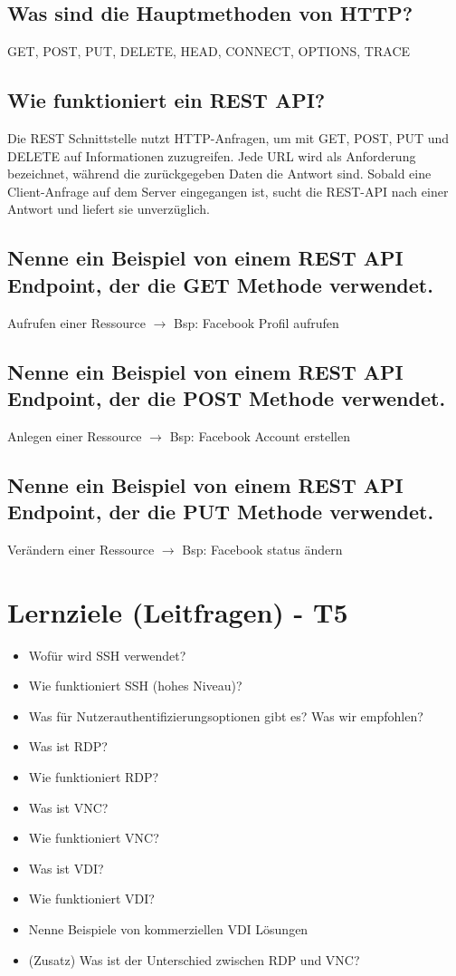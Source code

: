\subsection*{Was sind die Hauptmethoden von HTTP?}
GET, POST, PUT, DELETE, HEAD, CONNECT, OPTIONS, TRACE

\subsection*{Wie funktioniert ein REST API?}
Die REST Schnittstelle nutzt HTTP-Anfragen, um mit GET, POST, PUT und DELETE auf Informationen zuzugreifen. Jede URL wird als Anforderung bezeichnet, während die zurückgegeben Daten die Antwort sind. Sobald eine Client-Anfrage auf dem Server eingegangen ist, sucht die REST-API nach einer Antwort und liefert sie unverzüglich.

\subsection*{Nenne ein Beispiel von einem REST API Endpoint, der die GET Methode verwendet.}
Aufrufen einer Ressource $\rightarrow$ Bsp: Facebook Profil aufrufen

\subsection*{Nenne ein Beispiel von einem REST API Endpoint, der die POST Methode verwendet.}
Anlegen einer Ressource $\rightarrow$ Bsp: Facebook Account erstellen

\subsection*{Nenne ein Beispiel von einem REST API Endpoint, der die PUT Methode verwendet.}
Verändern einer Ressource $\rightarrow$ Bsp: Facebook status ändern

\section{Lernziele (Leitfragen) - T5}
\begin{itemize}
    \item Wofür wird SSH verwendet?
    \item Wie funktioniert SSH (hohes Niveau)?
    \item Was für Nutzerauthentifizierungsoptionen gibt es? Was wir empfohlen?
    \item Was ist RDP?
    \item Wie funktioniert RDP?
    \item Was ist VNC?
    \item Wie funktioniert VNC?
    \item Was ist VDI?
    \item Wie funktioniert VDI?
    \item Nenne Beispiele von kommerziellen VDI Lösungen
    \item (Zusatz) Was ist der Unterschied zwischen RDP und VNC?
\end{itemize}

